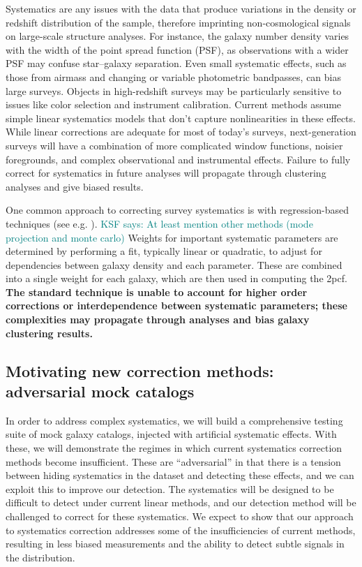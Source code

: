 \documentclass[12pt, fullpage, letterpaper]{article}
\newcommand{\KSF}[1]{\textcolor{teal}{KSF says: #1}}
\newcommand{\cf}{2pcf\xspace}
\begin{document}
Systematics are any issues with the data that produce variations in the density or redshift distribution of the sample, therefore imprinting non-cosmological signals on large-scale structure analyses.
For instance, the galaxy number density varies with the width of the point spread function (PSF), as observations with a wider PSF may confuse star--galaxy separation.
Even small systematic effects, such as those from airmass and changing or variable photometric bandpasses, can bias large surveys. 
Objects in high-redshift surveys may be particularly sensitive to issues like color selection and instrument calibration.
Current methods assume simple linear systematics models that don't capture nonlinearities in these effects.
While linear corrections are adequate for most of today's surveys, next-generation surveys will have a combination of more complicated window functions, noisier foregrounds, and complex observational and instrumental effects.
Failure to fully correct for systematics in future analyses will propagate through clustering analyses and give biased results.

One common approach to correcting survey systematics is with regression-based techniques (see e.g. \citealt{Ross2010}). \KSF{At least mention other methods (mode projection and monte carlo)}
Weights for important systematic parameters are determined by performing a fit, typically linear or quadratic, to adjust for dependencies between galaxy density and each parameter.
These are combined into a single weight for each galaxy, which are then used in computing the \cf.
\textbf{The standard technique is unable to account for higher order corrections or interdependence between systematic parameters; these complexities may propagate through analyses and bias galaxy clustering results.}

\subsection{Motivating new correction methods: adversarial mock catalogs}

In order to address complex systematics, we will build a comprehensive testing suite of mock galaxy catalogs, injected with artificial systematic effects.
With these, we will demonstrate the regimes in which current systematics correction methods become insufficient.
These are ``adversarial'' in that there is a tension between hiding systematics in the dataset and detecting these effects, and we can exploit this to improve our detection.
The systematics will be designed to be difficult to detect under current linear methods, and our detection method will be challenged to correct for these systematics. 
We expect to show that our approach to systematics correction addresses some of the insufficiencies of current methods, resulting in less biased measurements and the ability to detect subtle signals in the distribution.
\end{document}
